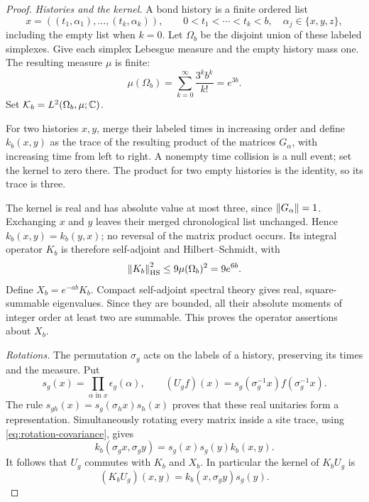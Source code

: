 \begin{proof}
\emph{Histories and the kernel.}
A bond history is a finite ordered list
\[
 x=((t_1,\alpha_1),\ldots,(t_k,\alpha_k)),
 \qquad 0<t_1<\cdots<t_k<b,\quad
 \alpha_j\in\{x,y,z\},
\]
including the empty list when $k=0$. Let $\Omega_b$ be the disjoint union
of these labeled simplexes. Give each simplex Lebesgue measure and the
empty history mass one. The resulting measure $\mu$ is finite:
\begin{equation}\label{eq:history-mass}
 \mu(\Omega_b)=\sum_{k=0}^\infty\frac{3^kb^k}{k!}=e^{3b}.
\end{equation}
Set $\mathcal K_b=L^2(\Omega_b,\mu;\mathbb C)$.

For two histories $x,y$, merge their labeled times in increasing order
and define $k_b(x,y)$ as the trace of the resulting product of the
matrices $G_\alpha$, with increasing time from left to right. A nonempty
time collision is a null event; set the kernel to zero there. The product
for two empty histories is the identity, so its trace is three.

The kernel is real and has absolute value at most three, since
$\left\lVert G_\alpha\right\rVert=1$. Exchanging $x$ and $y$ leaves their merged
chronological list unchanged. Hence $k_b(x,y)=k_b(y,x)$; no reversal of
the matrix product occurs. Its integral operator $K_b$ is therefore
self-adjoint and Hilbert--Schmidt, with
\[
 \left\lVert K_b\right\rVert_{\mathrm{HS}}^2\le9\mu(\Omega_b)^2=9e^{6b}.
\]
Define $X_b=e^{-ab}K_b$. Compact self-adjoint spectral theory gives real,
square-summable eigenvalues. Since they are bounded, all their absolute
moments of integer order at least two are summable. This proves the
operator assertions about $X_b$.

\emph{Rotations.}
The permutation $\sigma_g$ acts on the labels of a history, preserving
its times and the measure. Put
\[
 s_g(x)=\prod_{\alpha\text{ in }x}\epsilon_g(\alpha),\qquad
 (U_g f)(x)=s_g(\sigma_g^{-1}x)f(\sigma_g^{-1}x).
\]
The rule
$s_{gh}(x)=s_g(\sigma_hx)s_h(x)$ proves that these real unitaries form a
representation. Simultaneously rotating every matrix inside a site
trace, using \eqref{eq:rotation-covariance}, gives
\[
 k_b(\sigma_gx,\sigma_gy)=s_g(x)s_g(y)k_b(x,y).
\]
It follows that $U_g$ commutes with $K_b$ and $X_b$. In particular the
kernel of $K_bU_g$ is
\begin{equation}\label{eq:twisted-kernel}
 (K_bU_g)(x,y)=k_b(x,\sigma_gy)s_g(y).
\end{equation}


\end{proof}
